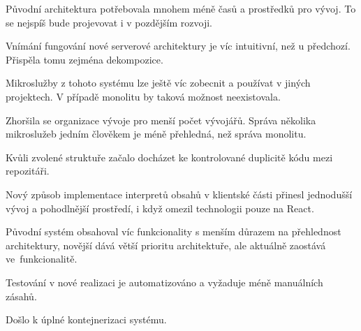 \begin{ul}
   \item Původní  architektura potřebovala mnohem méně časů a prostředků pro vývoj.
   To se nejspíš bude projevovat i v pozdějším rozvoji.
   \item Vnímání fungování nové serverové architektury je víc intuitivní, než u předchozí.
   Přispěla tomu zejména dekompozice.
   \item Mikroslužby z tohoto systému lze ještě víc zobecnit a používat v jiných projektech.
   V případě monolitu by taková možnost neexistovala.
   \item Zhoršila se organizace vývoje pro menší počet vývojářů.
   Správa několika mikroslužeb jedním člověkem je méně přehledná, než správa monolitu.
   \item Kvůli zvolené struktuře začalo docházet ke kontrolované duplicitě kódu mezi repozitáři.
   \item Nový způsob implementace interpretů obsahů v klientské části přinesl jednodušší vývoj a pohodlnější prostředí, i když omezil technologii pouze na React.
   \item Původní systém obsahoval víc funkcionality s menším důrazem na přehlednost architektury, novější dává větší prioritu architektuře, ale aktuálně zaostává ve~funkcionalitě.
   \item Testování v nové realizaci je automatizováno a vyžaduje méně manuálních zásahů.
   \item Došlo k úplné kontejnerizaci systému.
\end{ul}





